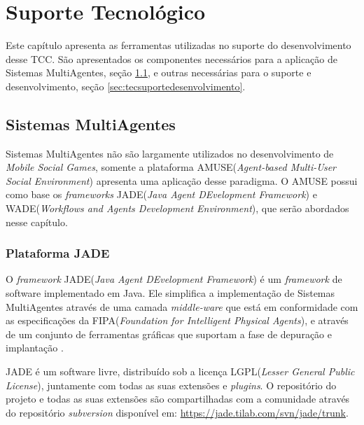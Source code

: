 \chapter{Suporte Tecnológico}

Este capítulo apresenta as ferramentas utilizadas no suporte do desenvolvimento
desse TCC. São apresentados os componentes necessários para a aplicação de
Sistemas MultiAgentes, seção \ref{sec:tecmultiagentes}, e outras necessárias
para o suporte e desenvolvimento, seção \ref{sec:tecsuportedesenvolvimento}.

\section{Sistemas MultiAgentes}
\label{sec:tecmultiagentes}

Sistemas MultiAgentes não são largamente utilizados no desenvolvimento de
\textit{Mobile Social Games}, somente a plataforma AMUSE(\textit{Agent-based
Multi-User Social Environment}) apresenta uma aplicação desse paradigma. O AMUSE
possui como base os \textit{frameworks} JADE(\textit{Java Agent DEvelopment
Framework}) e WADE(\textit{Workflows and Agents Development Environment}), que
serão abordados nesse capítulo.

    \subsection{Plataforma JADE}

O \textit{framework} JADE(\textit{Java Agent DEvelopment Framework}) é um
\textit{framework} de software implementado em Java. Ele simplifica a
implementação de Sistemas MultiAgentes através de uma camada
\textit{middle-ware} que está em conformidade com as especificações da
FIPA(\textit{Foundation for Intelligent Physical Agents}), e através de um
conjunto de ferramentas gráficas que suportam a fase de depuração e implantação
\cite{jade}.

JADE é um software livre, distribuído sob a licença LGPL(\textit{Lesser General
Public License}), juntamente com todas as suas extensões e \textit{plugins}. O
repositório do projeto e todas as suas extensões são compartilhadas com a
comunidade através do repositório \textit{subversion} disponível em:
\url{https://jade.tilab.com/svn/jade/trunk}.

